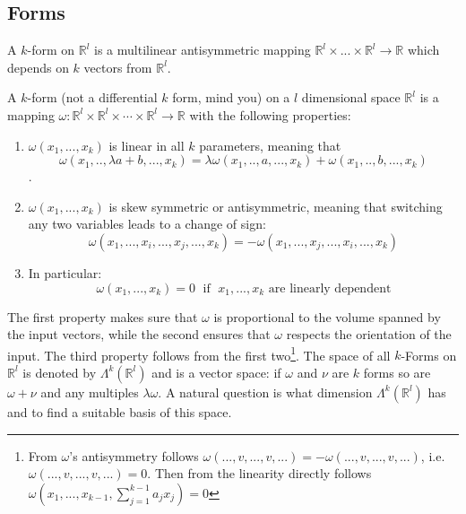 \subsection{Forms}
\label{subsec::forms}
A $k$-form on $\mathbb R^l$ is a multilinear antisymmetric mapping $\mathbb R^l \times ... \times \mathbb R^l \to \mathbb R$ which depends on $k$ vectors from $\mathbb R^l$. 
\begin{definition}[$k$-form]
 A $k$-form (not a differential $k$ form, mind you) on a $l$ dimensional space $\mathbb R^l$ is a mapping $\omega : \mathbb R^l \times \mathbb R^l\times \cdots \times  \mathbb R^l \rightarrow \mathbb R$ with the following properties:
\begin{enumerate}
\item $\omega(x_1,...,x_k)$ is linear in all $k$ parameters, meaning that \[\omega(x_1,..,\lambda a + b,..., x_k) = \lambda \omega(x_1,..,a,..., x_k) + \omega(x_1,.., b,..., x_k)\].
\item $\omega(x_1,...,x_k)$ is skew symmetric or antisymmetric, meaning that switching any two variables leads to a change of sign:
\[\omega(x_1,...,x_i,...,x_j,...,x_k) = - \omega(x_1,...,x_j,...,x_i,...,x_k)\]
\item In particular:
\[\omega(x_1,...,x_k) = 0 \;\text{ if }\;x_1,...,x_k \text{ are linearly dependent}\]
\end{enumerate}
\end{definition}

The first property makes sure that $\omega$ is proportional to the volume spanned by the input vectors, while the second ensures that $\omega$ respects the orientation of the input.
The third property follows from the first two\footnote{From $\omega$'s antisymmetry follows $\omega(...,v,...,v,...) = -\omega(...,v,...,v,...)$, i.e. $\omega(...,v,...,v,...) = 0$. Then from the linearity directly follows  $\omega(x_1,...,x_{k-1}, \sum_{j=1}^{k-1} a_jx_j) = 0$}. The space of all $k$-Forms on $\mathbb R^l$ is denoted by $\Lambda^k (\mathbb R^l)$ and is a vector space: if $\omega$ and $\nu$ are $k$ forms so are $\omega + \nu$ and any multiples $\lambda \omega$. A natural question is what dimension $\Lambda^k(\mathbb R^l)$ has and to find a suitable basis of this space.

